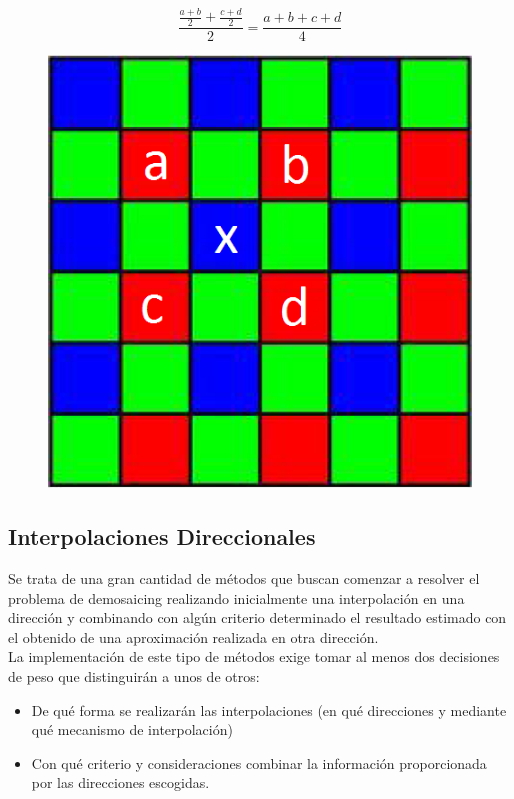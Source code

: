 \documentclass[a4paper]{article}
\begin{document}
\[
 \frac{\frac{a+b}{2} + \frac{c+d}{2}}{2} = \frac{a+b+c+d}{4}
\]

\begin{figure}[h!]
	\caption{}
	\begin{center}
	\includegraphics[scale=0.36]{imagenes/bilineal}
	\label{bilineal}
  \end{center}
\end{figure}

\newpage
\subsection{Interpolaciones Direccionales}
Se trata de una gran cantidad de métodos que buscan comenzar a resolver el problema de demosaicing realizando inicialmente una interpolación en una dirección y combinando con algún criterio determinado el resultado estimado con el obtenido de una aproximación realizada en otra dirección.\\

La implementación de este tipo de métodos exige tomar al menos dos decisiones de peso que distinguirán a unos de otros:\\

\begin{itemize}
    \item De qué forma se realizarán las interpolaciones (en qué direcciones y mediante qué mecanismo de interpolación)
    \item Con qué criterio y consideraciones combinar la información proporcionada por las direcciones escogidas.
\end{itemize}
\end{document}
